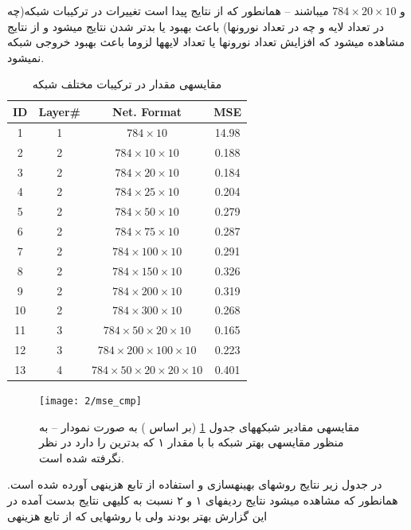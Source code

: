 \documentclass[10pt,a4paper]{article}
\newcommand{\نیمفاصله}{\halfspace}
\renewcommand{\ }{\halfspace}
\newcommand{\بپ}{انتشار-به-عقب }
\newcommand{\منست}{\lr{MNIST} }
\newcommand{\مسی}{\lr{MSE} }
\newcommand{\فوتنت}[1]{\footnote{\lr{#1}}}
\begin{document}
و
$784 \times 20 \times 10$
می\ باشند -- همان\ طور که از نتایج پیدا است تغییرات در ترکیبات شبکه(چه در تعداد لایه و چه در تعداد نورون\ ها) باعث بهبود یا بدتر شدن نتایج می\ شود و از نتایج مشاهده می\ شود که افزایش تعداد نورون\ ها یا تعداد لایه\ ها لزوما باعث بهبود خروجی شبکه نمی\ شود.
\begin{table}
\begin{latin}
\centering
\begin{tabular}{c|c|c|c}
ID & Layer\# & Net. Format & MSE\\
\hline
1 & 1 & $784 \times 10$ & 14.98\\
\hline
2 & 2 & $784 \times 10 \times 10$ & 0.188\\
3 & 2 & $784 \times 20 \times 10$ & 0.184\\
4 & 2 & $784 \times 25 \times 10$ & 0.204\\
5 & 2 & $784 \times 50 \times 10$ & 0.279\\
6 & 2 & $784 \times 75 \times 10$ & 0.287\\
7 & 2 & $784 \times 100 \times 10$ & 0.291\\
8 & 2 & $784 \times 150 \times 10$ & 0.326\\
9 & 2 & $784 \times 200 \times 10$ & 0.319\\
10 & 2 & $784 \times 300 \times 10$ & 0.268\\
\hline
11 & 3 & $784 \times 50 \times 20 \times 10$ & 0.165\\
12 & 3 & $784 \times 200 \times 100 \times 10$ & 0.223\\
\hline
13 & 4 & $784 \times 50 \times 20 \times 20 \times 10$ & 0.401\\
\end{tabular}
\end{latin}
\caption{مقایسه\ ی مقدار \مسی در ترکیبات مختلف شبکه}\label{tab:mse_cmp}
\end{table}
\begin{figure}[h!]
\centering
\texttt{[image: 2/mse\_cmp]}
\caption{ مقایسه\ ی مقادیر \مسی شبکه\ های جدول
\ref{tab:mse_cmp}
(بر اساس )
به صورت نمودار -- به منظور مقایسه\ ی بهتر \مسی شبکه با  با مقدار ۱ که بدترین \مسی را دارد در نظر نگرفته شده است.
}\label{fig:sec2_cmp}
\end{figure}
در جدول زیر نتایج روش\ های بهینه\ سازی و استفاده از تابع هزینه\ ی
آورده شده است. همان\ طور که مشاهده می\ شود نتایج ردیف\ های ۱ و ۲ نسبت به کلیه\ ی نتایج بدست آمده در این گزارش بهتر بودند ولی با روش\ هایی که از تابع هزینه\ ی
\end{document}
